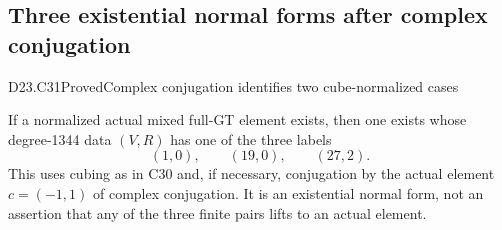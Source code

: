 \subsection{Three existential normal forms after complex conjugation}

\begin{statement}{D23.C31}{Proved}{Complex conjugation identifies two cube-normalized cases}
\end{statement}
If a normalized actual mixed full-GT element exists, then
one exists whose degree-1344 data $(V,R)$ has one of the
three labels
\[
                           (1,0),\qquad(19,0),\qquad(27,2).
                                                               \tag{D23.C31.1}
\]
This uses cubing as in C30 and, if necessary, conjugation
by the actual element $c=(-1,1)$ of complex conjugation.
It is an existential normal form, not an assertion that
any of the three finite pairs lifts to an actual element.

